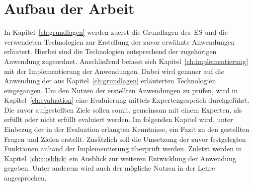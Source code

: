 \section{Aufbau der Arbeit}\label{sec:aufbau-der-arbeit}
In Kapitel~\ref{ch:grundlagen} werden zuerst die Grundlagen des~\ac{ES} und die verwendeten Technologien
zur Erstellung der zuvor erwähnte Anwendungen erläutert.
Hierbei sind die Technologien entsprechend der zugehörigen Anwendung zugeordnet.
Anschließend befasst sich Kapitel~\ref{ch:implementierung} mit der Implementierung der Anwendungen.
Dabei wird genauer auf die Anwendung der aus Kapitel~\ref{ch:grundlagen} erläuterten Technologien eingegangen.
Um den Nutzen der erstellten Anwendungen zu prüfen, wird in Kapitel~\ref{ch:evaluation} eine Evaluierung mittels Expertengespräch durchgeführt.
Die zuvor aufgestellten Ziele sollen somit, gemeinsam mit einem Experten, als erfüllt oder nicht erfüllt evaluiert werden.
Im folgenden Kapitel wird, unter Einbezug der in der Evaluation erlangten Kenntnisse, ein Fazit zu den gestellten Fragen und Zielen erstellt.
Zusätzlich soll die Umsetzung der zuvor festgelegten Funktionen anhand der Implementierung überprüft werden.
Zuletzt werden in Kapitel~\ref{ch:ausblick} ein Ausblick zur weiteren Entwicklung der Anwendung gegeben.
Unter anderem wird auch der mögliche Nutzen in der Lehre angesprochen.
